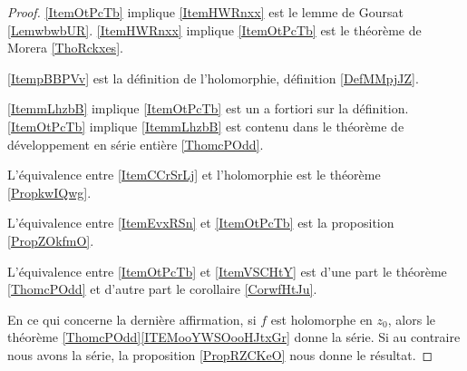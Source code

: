 \begin{proof}
    \ref{ItemOtPcTb} implique \ref{ItemHWRnxx} est le lemme de Goursat \ref{LemwbwbUR}. \ref{ItemHWRnxx} implique \ref{ItemOtPcTb} est le théorème de Morera \ref{ThoRckxes}.

    \ref{ItempBBPVv} est la définition de l'holomorphie, définition \ref{DefMMpjJZ}.

    \ref{ItemmLhzbB} implique \ref{ItemOtPcTb} est un a fortiori sur la définition. \ref{ItemOtPcTb} implique \ref{ItemmLhzbB} est contenu dans le théorème de développement en série entière \ref{ThomcPOdd}.

    L'équivalence entre \ref{ItemCCrSrLj} et l'holomorphie est le théorème \ref{PropkwIQwg}.

    L'équivalence entre \ref{ItemEvxRSn} et \ref{ItemOtPcTb} est la proposition \ref{PropZOkfmO}.

    L'équivalence entre \ref{ItemOtPcTb} et \ref{ItemVSCHtY} est d'une part le théorème \ref{ThomcPOdd} et d'autre part le corollaire \ref{CorwfHtJu}.

    En ce qui concerne la dernière affirmation, si \( f\) est holomorphe en \( z_0\), alors le théorème \ref{ThomcPOdd}\ref{ITEMooYWSOooHJtxGr} donne la série. Si au contraire nous avons la série, la proposition \ref{PropRZCKeO} nous donne le résultat.
\end{proof}
